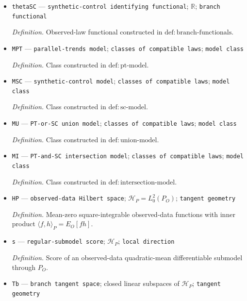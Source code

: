 \documentclass{article}
\begin{document}
\begin{itemize}
  \par\smallskip\noindent\emph{Definition.} Observed-law functional constructed in \(\mathrm{def{:}branch\text{-}functionals}\).
  \item \texttt{thetaSC} --- \texttt{synthetic-\allowbreak{}control identifying functional}; \(\mathbb R\); \texttt{branch functional}
  \par\smallskip\noindent\emph{Definition.} Observed-law functional constructed in \(\mathrm{def{:}branch\text{-}functionals}\).
  \item \texttt{MPT} --- \texttt{parallel-\allowbreak{}trends model}; \texttt{classes of compatible laws}; \texttt{model class}
  \par\smallskip\noindent\emph{Definition.} Class constructed in \(\mathrm{def{:}pt\text{-}model}\).
  \item \texttt{MSC} --- \texttt{synthetic-\allowbreak{}control model}; \texttt{classes of compatible laws}; \texttt{model class}
  \par\smallskip\noindent\emph{Definition.} Class constructed in \(\mathrm{def{:}sc\text{-}model}\).
  \item \texttt{MU} --- \texttt{PT-\allowbreak{}or-\allowbreak{}SC union model}; \texttt{classes of compatible laws}; \texttt{model class}
  \par\smallskip\noindent\emph{Definition.} Class constructed in \(\mathrm{def{:}union\text{-}model}\).
  \item \texttt{MI} --- \texttt{PT-\allowbreak{}and-\allowbreak{}SC intersection model}; \texttt{classes of compatible laws}; \texttt{model class}
  \par\smallskip\noindent\emph{Definition.} Class constructed in \(\mathrm{def{:}intersection\text{-}model}\).
  \item \texttt{HP} --- \texttt{observed-\allowbreak{}data Hilbert space}; \(\mathcal H_P=L_0^2(P_O)\); \texttt{tangent geometry}
  \par\smallskip\noindent\emph{Definition.} Mean-zero square-integrable observed-data functions with inner product \(\langle f,h\rangle_P=E_O[fh]\).
  \item \texttt{s} --- \texttt{regular-\allowbreak{}submodel score}; \(\mathcal H_P\); \texttt{local direction}
  \par\smallskip\noindent\emph{Definition.} Score of an observed-data quadratic-mean differentiable submodel through \(P_O\).
  \item \texttt{Tb} --- \texttt{branch tangent space}; closed linear subspaces of \(\mathcal H_P\); \texttt{tangent geometry}

\end{itemize}
\end{document}
